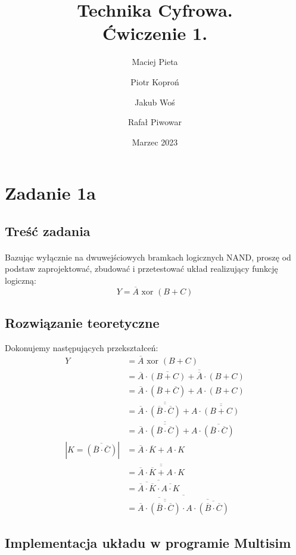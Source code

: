 \documentclass{article}
\author{Maciej Pieta \and Piotr Koproń \and Jakub Woś \and Rafał Piwowar}
\date{Marzec 2023}
\title{Technika Cyfrowa. \\ Ćwiczenie 1.}
\begin{document}
\maketitle
\newpage
\section{Zadanie 1a}
\subsection{Treść zadania}
\paragraph{}
Bazując wyłącznie na dwuwejściowych bramkach logicznych NAND, proszę od podstaw  zaprojektować, zbudować i przetestować układ realizujący funkcję logiczną:
\begin{equation}
Y = \overline{A} \text{ xor } (B + C)
\end{equation}
\subsection{Rozwiązanie teoretyczne}
Dokonujemy następujących przekształceń:
\begin{align*}
 Y &= \overline{A} \text{ xor } (B + C) \\
 &= \overline{A} \cdot \overline{(B+C)} + \overline{\overline{A}} \cdot (B+C) \\
&= \overline{A} \cdot (\overline{B}+\overline{C}) + A \cdot (B+C) \\
&= \overline{A} \cdot \overline{\overline{(\overline{B} \cdot \overline{C})}} + A \cdot \overline{\overline{(B+C)}} \\
&= \overline{A} \cdot \overline{\overline{(\overline{B} \cdot \overline{C})}} + A \cdot \overline{(\overline{B} \cdot \overline{C})} \\
|K = \overline{(\overline{B} \cdot \overline{C})}| &= \overline{A} \cdot \overline{K} + A \cdot K \\
&= \overline{\overline{\overline{A} \cdot \overline{K} + A \cdot K}} \\
&= \overline{\overline{\overline{A} \cdot \overline{K}} \cdot \overline{A \cdot K}} \\
&= \overline{\overline{\overline{A} \cdot \overline{\overline{(\overline{B} \cdot \overline{C})}}} \cdot \overline{A \cdot \overline{(\overline{B} \cdot \overline{C})}}}
\end{align*}
\subsection{Implementacja układu w programie Multisim}
\end{document}
